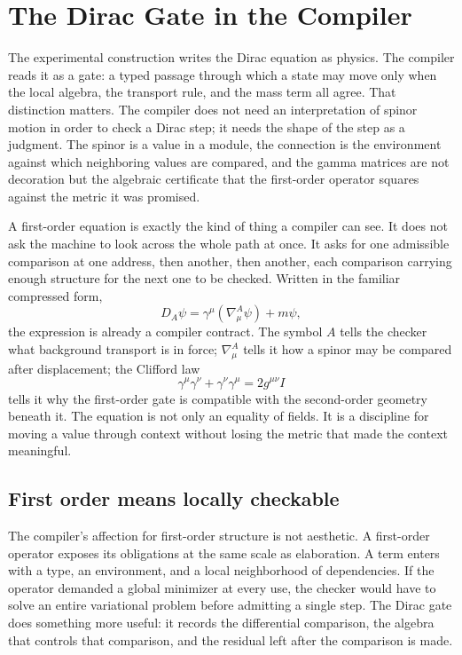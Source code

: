 \chapter{The Dirac Gate in the Compiler}
\label{chap:dirac-gate-compiler}

The experimental construction writes the Dirac equation as physics. The compiler reads it as a gate: a
typed passage through which a state may move only when the local algebra, the transport rule, and the mass
term all agree. That distinction matters. The compiler does not need an interpretation of spinor motion in
order to check a Dirac step; it needs the shape of the step as a judgment. The spinor is a value in a
module, the connection is the environment against which neighboring values are compared, and the gamma
matrices are not decoration but the algebraic certificate that the first-order operator squares against the
metric it was promised.

A first-order equation is exactly the kind of thing a compiler can see. It does not ask the machine to
look across the whole path at once. It asks for one admissible comparison at one address, then another, then
another, each comparison carrying enough structure for the next one to be checked. Written in the familiar
compressed form,
\[
  D_A\psi
    =
  \gamma^\mu(\nabla_\mu^A \psi) + m\psi ,
\]
the expression is already a compiler contract. The symbol \(A\) tells the checker what background transport
is in force; \(\nabla_\mu^A\) tells it how a spinor may be compared after displacement; the Clifford law
\[
  \gamma^\mu\gamma^\nu+\gamma^\nu\gamma^\mu
    =
  2g^{\mu\nu}I
\]
tells it why the first-order gate is compatible with the second-order geometry beneath it. The equation is
not only an equality of fields. It is a discipline for moving a value through context without losing the
metric that made the context meaningful.

\section{First order means locally checkable}
\label{se:first-order-locally-checkable}

The compiler's affection for first-order structure is not aesthetic. A first-order operator exposes its
obligations at the same scale as elaboration. A term enters with a type, an environment, and a local
neighborhood of dependencies. If the operator demanded a global minimizer at every use, the checker would
have to solve an entire variational problem before admitting a single step. The Dirac gate does something
more useful: it records the differential comparison, the algebra that controls that comparison, and the
residual left after the comparison is made.


